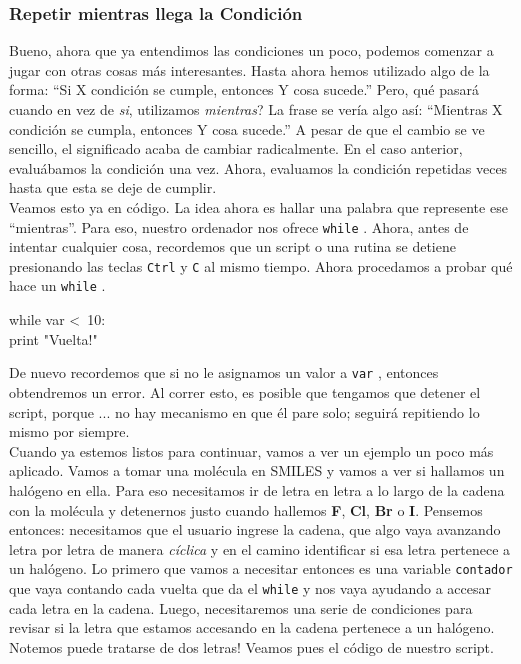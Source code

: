 \documentclass[10pt,letterpaper]{article}
\newcommand{\inlinecode}[1]{
\colorbox{light-gray}{\texttt{#1}}
}
\newenvironment{Code}
{
\begin{lrbox}{\selvestebox}%
\begin{minipage}{\dimexpr\columnwidth-2\fboxsep\relax}
\fontfamily{\ttdefault}\selectfont
}
{\end{minipage}\end{lrbox}%
\begin{center}
\colorbox{light-gray}{\usebox{\selvestebox}}
\end{center}
}
\begin{document}
\subsubsection{Repetir mientras llega la Condici\'on}
Bueno, ahora que ya entendimos las condiciones un poco, podemos comenzar a jugar con otras cosas m\'as interesantes. Hasta ahora hemos utilizado algo de la forma: ``Si X condici\'on se cumple, entonces Y cosa sucede.'' Pero, qu\'e pasar\'a cuando en vez de \emph{si}, utilizamos \emph{mientras}? La frase se ver\'ia algo as\'i: ``Mientras X condici\'on se cumpla, entonces Y cosa sucede.'' A pesar de que el cambio se ve sencillo, el significado acaba de cambiar radicalmente. En el caso anterior, evalu\'abamos la condici\'on una vez. Ahora, evaluamos la condici\'on repetidas veces hasta que esta se deje de cumplir.\\

Veamos esto ya en c\'odigo. La idea ahora es hallar una palabra que represente ese ``mientras''. Para eso, nuestro ordenador nos ofrece \inlinecode{while}. Ahora, antes de intentar cualquier cosa, recordemos que un script o una rutina se detiene presionando las teclas \inlinecode{Ctrl} y \inlinecode{C} al mismo tiempo. Ahora procedamos a probar qu\'e hace un \inlinecode{while}.

\begin{Code}
while var <\ 10:\\
\hspace*{5mm} print "Vuelta!"
\end{Code}

De nuevo recordemos que si no le asignamos un valor a \inlinecode{var}, entonces obtendremos un error. Al correr esto, es posible que tengamos que detener el script, porque ... no hay mecanismo en que \'el pare solo; seguir\'a repitiendo lo mismo por siempre.\\

Cuando ya estemos listos para continuar, vamos a ver un ejemplo un poco m\'as aplicado. Vamos a tomar una mol\'ecula en SMILES y vamos a ver si hallamos un hal\'ogeno en ella. Para eso necesitamos ir de letra en letra a lo largo de la cadena con la mol\'ecula y detenernos justo cuando hallemos \textbf{F}, \textbf{Cl}, \textbf{Br} o \textbf{I}. Pensemos entonces: necesitamos que el usuario ingrese la cadena, que algo vaya avanzando letra por letra de manera \emph{c\'iclica} y en el camino identificar si esa letra pertenece a un hal\'ogeno. Lo primero que vamos a necesitar entonces es una variable \inlinecode{contador} que vaya contando cada vuelta que da el \inlinecode{while} y nos vaya ayudando a accesar cada letra en la cadena. Luego, necesitaremos una serie de condiciones para revisar si la letra que estamos accesando en la cadena pertenece a un hal\'ogeno. Notemos puede tratarse de dos letras! Veamos pues el c\'odigo de nuestro script.
\end{document}
